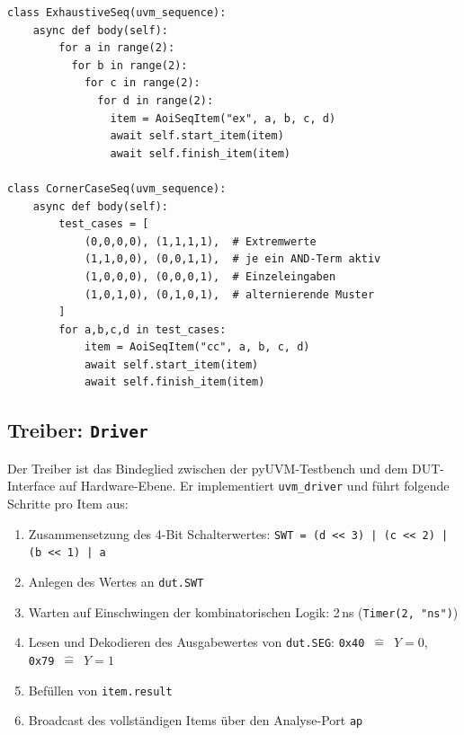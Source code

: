 ﻿\documentclass[12pt,a4paper]{report}
\begin{document}
\begin{lstlisting}[style=pythonstyle, caption={\texttt{ExhaustiveSeq} und \texttt{CornerCaseSeq}}]
class ExhaustiveSeq(uvm_sequence):
    async def body(self):
        for a in range(2):
          for b in range(2):
            for c in range(2):
              for d in range(2):
                item = AoiSeqItem("ex", a, b, c, d)
                await self.start_item(item)
                await self.finish_item(item)

class CornerCaseSeq(uvm_sequence):
    async def body(self):
        test_cases = [
            (0,0,0,0), (1,1,1,1),  # Extremwerte
            (1,1,0,0), (0,0,1,1),  # je ein AND-Term aktiv
            (1,0,0,0), (0,0,0,1),  # Einzeleingaben
            (1,0,1,0), (0,1,0,1),  # alternierende Muster
        ]
        for a,b,c,d in test_cases:
            item = AoiSeqItem("cc", a, b, c, d)
            await self.start_item(item)
            await self.finish_item(item)
\end{lstlisting}

\subsection{Treiber: \texttt{Driver}}
\label{sssec:driver}

Der Treiber ist das Bindeglied zwischen der pyUVM-Testbench und dem
DUT-Interface auf Hardware-Ebene. Er implementiert
\texttt{uvm\_driver} und führt folgende Schritte pro Item aus:

\begin{enumerate}
    \item Zusammensetzung des 4-Bit Schalterwertes:
          \texttt{SWT = (d << 3) | (c << 2) | (b << 1) | a}
    \item Anlegen des Wertes an \texttt{dut.SWT}
    \item Warten auf Einschwingen der kombinatorischen Logik: 2\,ns (\texttt{Timer(2, "ns")})
    \item Lesen und Dekodieren des Ausgabewertes von \texttt{dut.SEG}:
          \texttt{0x40}~$\widehat{=}$~$Y=0$, \texttt{0x79}~$\widehat{=}$~$Y=1$
    \item Befüllen von \texttt{item.result}
    \item Broadcast des vollständigen Items über den Analyse-Port \texttt{ap}
\end{enumerate}
\end{document}
